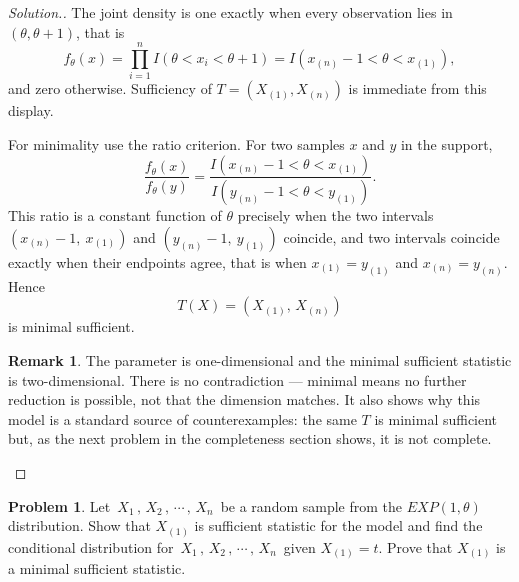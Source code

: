 \documentclass[12pt,a4paper]{report}
\theoremstyle{definition}
\newtheorem*{remark}{Remark}
\newtheorem{problemx}{Problem}[section]
\newenvironment{problem}{\begin{problemx}}{\end{problemx}}
\newenvironment{solution}
  {\renewcommand{\qedsymbol}{}\begin{proof}[\textit{Solution}.]}
  {\end{proof}}
\begin{document}
\begin{solution}
The joint density is one exactly when every observation lies in
$(\theta,\theta+1)$, that is
\[f_{\theta}(x) = \prod_{i=1}^{n} I\left(\theta<x_i<\theta+1\right)
= I\left(x_{(n)}-1 < \theta < x_{(1)}\right),\]
and zero otherwise. Sufficiency of $T=\left(X_{(1)},X_{(n)}\right)$ is immediate
from this display.

For minimality use the ratio criterion. For two samples $x$ and $y$ in the
support,
\[\frac{f_{\theta}(x)}{f_{\theta}(y)}
= \frac{I\left(x_{(n)}-1<\theta<x_{(1)}\right)}{I\left(y_{(n)}-1<\theta<y_{(1)}\right)} .\]
This ratio is a constant function of $\theta$ precisely when the two intervals
$\left(x_{(n)}-1,\ x_{(1)}\right)$ and $\left(y_{(n)}-1,\ y_{(1)}\right)$
coincide, and two intervals coincide exactly when their endpoints agree, that is
when $x_{(1)}=y_{(1)}$ and $x_{(n)}=y_{(n)}$. Hence
\[T(X) = \left(X_{(1)},\, X_{(n)}\right)\]
is minimal sufficient.

\begin{remark}
The parameter is one-dimensional and the minimal sufficient statistic is
two-dimensional. There is no contradiction --- minimal means no further
reduction is possible, not that the dimension matches. It also shows why this
model is a standard source of counterexamples: the same $T$ is minimal
sufficient but, as the next problem in the completeness section shows, it is not
complete.
\end{remark}
\end{solution}

\begin{problem}
Let $\, X_1\, , \, X_2\, , \, \cdots \, , \, X_n\,$ be a random sample from the $EXP(1, \theta)$ distribution. Show that $X_{(1)}$ is sufficient statistic for the model and find the conditional distribution for $\, X_1\, , \, X_2\, , \, \cdots \, , \, X_n\,$ given $X_{(1)} = t$. Prove that $X_{(1)}$ is a minimal sufficient statistic.
\end{problem}
\end{document}
